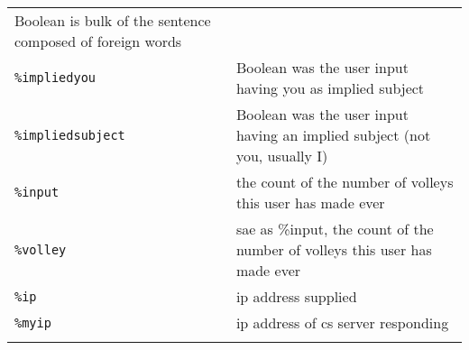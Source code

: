 \documentclass[]{article}
\begin{document}
\begin{longtable}[]{@{}ll@{}}
\begin{minipage}[t]{0.10\columnwidth}
Boolean is bulk of the sentence composed of foreign words\strut
\end{minipage}\tabularnewline
\begin{minipage}[t]{0.26\columnwidth}\raggedright\strut
\texttt{\%impliedyou}\strut
\end{minipage} & \begin{minipage}[t]{0.10\columnwidth}\raggedright\strut
Boolean was the user input having you as implied subject\strut
\end{minipage}\tabularnewline
\begin{minipage}[t]{0.26\columnwidth}\raggedright\strut
\texttt{\%impliedsubject}\strut
\end{minipage} & \begin{minipage}[t]{0.10\columnwidth}\raggedright\strut
Boolean was the user input having an implied subject (not you, usually
I)\strut
\end{minipage}\tabularnewline
\begin{minipage}[t]{0.26\columnwidth}\raggedright\strut
\texttt{\%input}\strut
\end{minipage} & \begin{minipage}[t]{0.10\columnwidth}\raggedright\strut
the count of the number of volleys this user has made ever\strut
\end{minipage}\tabularnewline
\begin{minipage}[t]{0.26\columnwidth}\raggedright\strut
\texttt{\%volley}\strut
\end{minipage} & \begin{minipage}[t]{0.10\columnwidth}\raggedright\strut
sae as \%input, the count of the number of volleys this user has made
ever\strut
\end{minipage}\tabularnewline
\begin{minipage}[t]{0.26\columnwidth}\raggedright\strut
\texttt{\%ip}\strut
\end{minipage} & \begin{minipage}[t]{0.10\columnwidth}\raggedright\strut
ip address supplied\strut
\end{minipage}\tabularnewline
\begin{minipage}[t]{0.26\columnwidth}\raggedright\strut
\texttt{\%myip}\strut
\end{minipage} & \begin{minipage}[t]{0.10\columnwidth}\raggedright\strut
ip address of cs server responding\strut
\end{minipage}\tabularnewline
\begin{minipage}[t]{0.26\columnwidth}\raggedright\strut

\end{minipage}
\end{longtable}
\end{document}

